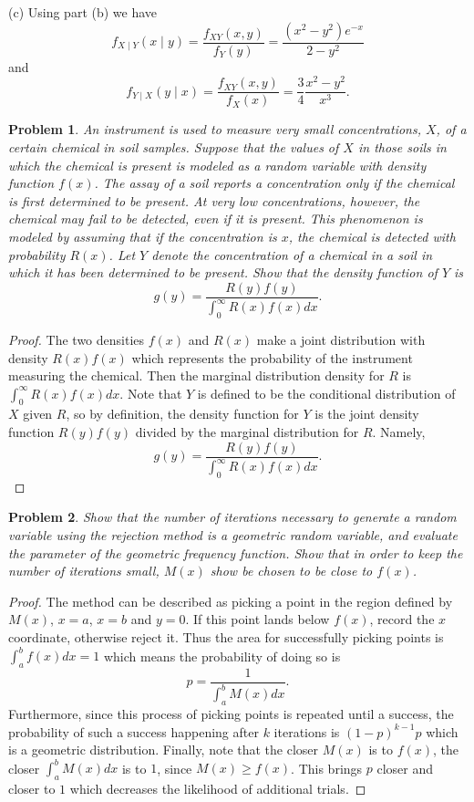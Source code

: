 \documentclass{article}
\newtheorem{problem}{Problem}
\begin{document}
(c) Using part (b) we have
\[
f_{X \mid Y}(x \mid y) = \frac{f_{XY}(x,y)}{f_Y(y)} = \frac{(x^2 - y^2) e^{-x}}{2-y^2}
\]
and
\[
f_{Y \mid X}(y \mid x) = \frac{f_{XY}(x,y)}{f_X(x)} = \frac{3}{4} \frac{x^2 - y^2}{x^3}.
\]

\begin{problem}
An instrument is used to measure very small concentrations, $X$, of a certain chemical in soil samples. Suppose that the values of $X$ in those soils in which the chemical is present is modeled as a random variable with density function $f(x)$. The assay of a soil reports a concentration only if the chemical is first determined to be present. At very low concentrations, however, the chemical may fail to be detected, even if it is present. This phenomenon is modeled by assuming that if the concentration is $x$, the chemical is detected with probability $R(x)$. Let $Y$ denote the concentration of a chemical in a soil in which it has been determined to be present. Show that the density function of $Y$ is
\[
g(y) = \frac{R(y) f(y)}{\int_{0}^{\infty} R(x)f(x) dx}.
\]
\end{problem}
\begin{proof}
The two densities $f(x)$ and $R(x)$ make a joint distribution with density $R(x)f(x)$ which represents the probability of the instrument measuring the chemical. Then the marginal distribution density for $R$ is $\int_0^{\infty} R(x)f(x)dx$. Note that $Y$ is defined to be the conditional distribution of $X$ given $R$, so by definition, the density function for $Y$ is the joint density function $R(y)f(y)$ divided by the marginal distribution for $R$. Namely,
\[
g(y) = \frac{R(y) f(y)}{\int_{0}^{\infty} R(x)f(x) dx}.
\]
\end{proof}

\begin{problem}
Show that the number of iterations necessary to generate a random variable using the rejection method is a geometric random variable, and evaluate the parameter of the geometric frequency function. Show that in order to keep the number of iterations small, $M(x)$ show be chosen to be close to $f(x)$.
\end{problem}
\begin{proof}
The method can be described as picking a point in the region defined by $M(x)$, $x = a$, $x = b$ and $y = 0$. If this point lands below $f(x)$, record the $x$ coordinate, otherwise reject it. Thus the area for successfully picking points is $\int_a^b f(x) dx = 1$ which means the probability of doing so is
\[
p = \frac{1}{\int_a^b M(x)dx}.
\]
Furthermore, since this process of picking points is repeated until a success, the probability of such a success happening after $k$ iterations is $(1 - p)^{k-1}p$ which is a geometric distribution. Finally, note that the closer $M(x)$ is to $f(x)$, the closer $\int_a^b M(x) dx$ is to $1$, since $M(x) \geq f(x)$. This brings $p$ closer and closer to $1$ which decreases the likelihood of additional trials.
\end{proof}
\end{document}
